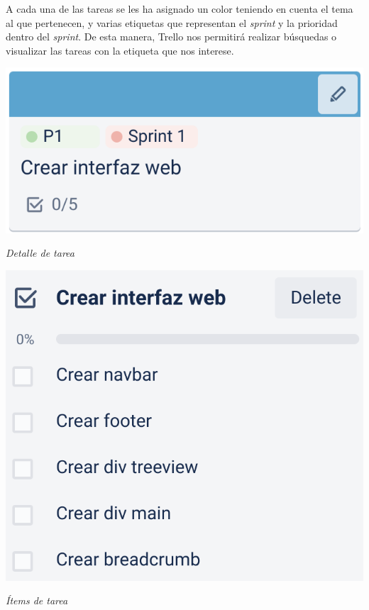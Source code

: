 \documentclass{\ClassPath/viu-tfm-template}
\begin{document}


A cada una de las tareas se les ha asignado un color teniendo en cuenta el tema al que pertenecen, y varias etiquetas que representan el \textit{sprint} y la prioridad dentro del \textit{sprint}. De esta manera, Trello nos permitirá realizar búsquedas o visualizar las tareas con la etiqueta que nos interese.


\begin{minipage}{0.48\linewidth}
    \includegraphics[width=\linewidth]{img/tarea.png}
    \vspace{-30pt}
    \begin{center}
        {\scriptsize \textit{Detalle de tarea}}
    \end{center}
\end{minipage}
\hfill
\begin{minipage}{0.40\linewidth}
    \includegraphics[width=\linewidth]{img/tarea1.png}
    \vspace{-30pt}
    \begin{center}
        {\scriptsize \textit{Ítems de tarea}}
    \end{center}
\end{minipage}
\end{document}
